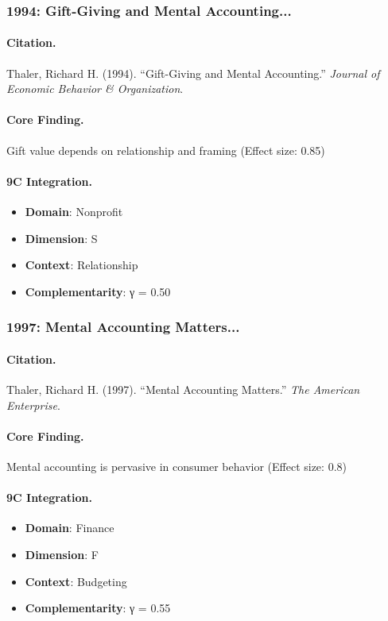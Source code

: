 \subsubsection{1994: Gift-Giving and Mental Accounting...}

\paragraph{Citation.}
Thaler, Richard H. (1994). ``Gift-Giving and Mental Accounting.''
\textit{Journal of Economic Behavior & Organization}.

\paragraph{Core Finding.}
Gift value depends on relationship and framing (Effect size: 0.85)

\paragraph{9C Integration.}
\begin{itemize}[nosep]
  \item \textbf{Domain}: Nonprofit
  \item \textbf{Dimension}: S
  \item \textbf{Context}: Relationship
  \item \textbf{Complementarity}: γ = 0.50
\end{itemize}

\subsubsection{1997: Mental Accounting Matters...}

\paragraph{Citation.}
Thaler, Richard H. (1997). ``Mental Accounting Matters.''
\textit{The American Enterprise}.

\paragraph{Core Finding.}
Mental accounting is pervasive in consumer behavior (Effect size: 0.8)

\paragraph{9C Integration.}
\begin{itemize}[nosep]
  \item \textbf{Domain}: Finance
  \item \textbf{Dimension}: F
  \item \textbf{Context}: Budgeting
  \item \textbf{Complementarity}: γ = 0.55
\end{itemize}

